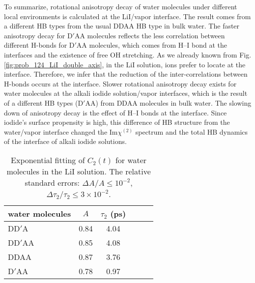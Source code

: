 To summarize, rotational anisotropy decay of water molecules under different local environments is calculated at the LiI/vapor interface. 
The result comes from a different HB types from the usual DDAA HB type in bulk water.
The faster anisotropy decay for D$'$AA molecules reflects the less correlation between different H-bonds for D$'$AA molecules, 
which comes from H--I bond at the interfaces and the existence of free OH stretching.
As we already known from Fig.\thinspace\ref{fig:prob_124_LiI_double_axis}, in the LiI solution, 
\I ions prefer to locate at the interface.  
Therefore, we infer that the reduction of the inter-correlations between H-bonds occurs at the interface. 
Slower rotational anisotropy decay exists for water molecules  at the alkali iodide solution/vapor interfaces, 
which is the result of a different HB types (D$'$AA) from DDAA molecules in bulk water. 
The slowing down of anisotropy decay is the effect of H--I bonds at the interface. 
Since iodide's surface propensity is high, this difference of HB structure from the water/vapor interface changed 
the Im$\chi^{(2)}$ spectrum and the total HB dynamics of the interface of alkali iodide solutions.  
%
\begin{table}[H]
\centering
\caption{\label{tab:fitting_c2_for_each_type_of_water}%
	Exponential fitting of $C_2(t)$ for water molecules in the LiI solution. 
        The relative standard errors: $\Delta A/A \le 10^{-2}$, $\Delta \tau_{2}/\tau_{2} \le 3\times 10^{-2}$.}
\begin{tabular}{lccccc}
water molecules & $A$  & $\tau_{2}$ (ps) \\
\hline
DD$'$A & 0.84 & 4.04  \\
DD$'$AA & 0.85 & 4.08  \\
DDAA & 0.87 & 3.76 \\
D$'$AA & 0.78 & 0.97 \\
\end{tabular}
\end{table}
%
